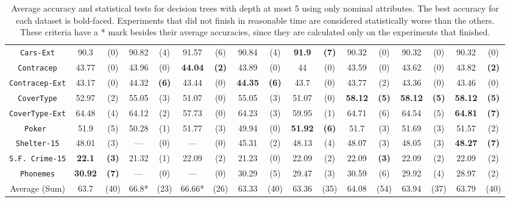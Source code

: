 \begin{sidewaystable*}[ph!]
\begin{tabular}{c|cc|cc|cc|cc|cc|cc|cc|cc}
{\tt Cars-Ext}      & 90.3     & (0)    & 90.82    & (4)    & 91.57    & (6)    & 90.84    & (4)    &{\bf 91.9}&{\bf(7)}& 90.32    & (0)              & 90.32    & (0)      & 90.32    & (0)      \\
{\tt Contracep}     & 43.77    & (0)    & 43.96    & (0)    &{\bf44.04}&{\bf(2)}& 43.89    & (0)    & 44       & (0)    & 43.59    & (0)              & 43.62    & (0)      & 43.82    & {\bf(2)} \\
{\tt Contracep-Ext} & 43.17    & (0)    & 44.32    &{\bf(6)}& 43.44    & (0)    &{\bf44.35}&{\bf(6)}& 43.7     & (0)    & 43.77    & (2)              & 43.36    & (0)      & 43.46    & (0)      \\
{\tt CoverType}     & 52.97    & (2)    & 55.05    & (3)    & 51.07    & (0)    & 55.05    & (3)    & 51.07    & (0)    &{\bf58.12}&{\bf(5)}          &{\bf58.12}& {\bf(5)} &{\bf58.12}& {\bf(5)} \\
{\tt CoverType-Ext} & 64.48    & (4)    & 64.12    & (2)    & 57.73    & (0)    & 64.23    & (3)    & 59.95    & (1)    & 64.71    & (6)              & 64.54    & (5)      &{\bf64.81}& {\bf(7)} \\
{\tt Poker }        & 51.9     & (5)    & 50.28    & (1)    & 51.77    & (3)    & 49.94    & (0)    &{\bf51.92}&{\bf(6)}& 51.7     & (3)              & 51.69    & (3)      & 51.57    & (2)      \\
{\tt Shelter-15}    & 48.01    & (3)    & ---      & (0)    & ---      & (0)    & 45.31    & (2)    & 48.13    & (4)    & 48.07    & (3)              & 48.05    & (3)      &{\bf48.27}& {\bf(7)} \\  
{\tt S.F. Crime-15} &{\bf22.1} &{\bf(3)}& 21.32    & (1)    & 22.09    & (2)    & 21.23    & (0)    & 22.09    & (2)    & 22.09    &{\bf(3)}          & 22.09    & (2)      & 22.09    & (2)      \\
{\tt Phonemes}      &{\bf30.92}&{\bf(7)}& ---      & (0)    & ---      & (0)    & 30.29    & (5)    & 29.47    & (3)    & 30.59    & (6)              & 29.92    & (4)      & 28.97    & (2)      \\
\hline
Average (Sum)       &  63.7    & (40)   & 66.8*    & (23)   & 66.66*   & (26)   & 63.33    & (40)   & 63.36    & (35)   & 64.08    & (54)             & 63.94    & (37)     & 63.79    & (40)

\end{tabular}
\caption{Average accuracy and statistical tests  for  decision trees with depth at most 5 using only nominal attributes. The best accuracy for each dataset is bold-faced. Experiments that did not finish in reasonable time are considered statistically worse than the others. These criteria have a * mark besides their average accuracies, since they are calculated only on the experiments that finished.}
\label{tab:nominal-5}
\normalsize
\end{sidewaystable*}


